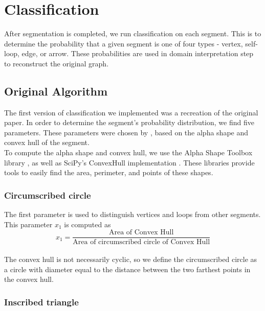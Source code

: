 \section{Classification}

After segmentation is completed, we run classification on each segment. This is to determine the probability that a given segment is one of four types - vertex, self-loop, edge, or arrow. These probabilities are used in domain interpretation step to reconstruct the original graph. 

\subsection{Original Algorithm}

The first version of classification we implemented was a recreation of the original paper. In order to determine the segment's probability distribution, we find five parameters. These parameters were chosen by \citeauthor{daly2015hand} \cite{daly2015hand}, based on the alpha shape and convex hull of the segment. \\ 

To compute the alpha shape and convex hull, we use the Alpha Shape Toolbox library \cite{alphashapetoolbox}, as well as SciPy's ConvexHull implementation \cite{scipy}. These libraries provide tools to easily find the area, perimeter, and points of these shapes. \\

\subsubsection{Circumscribed circle}

The first parameter is used to distinguish vertices and loops from other segments. This parameter $x_1$ is computed as \\

\begin{equation}
	x_1 = \frac{\text{Area of Convex Hull}}{\text{Area of circumscribed circle of Convex Hull}}
\end{equation} \\

The convex hull is not necessarily cyclic, so we define the circumscribed circle as a circle with diameter equal to the distance between the two farthest points in the convex hull. \\

\subsubsection{Inscribed triangle}

